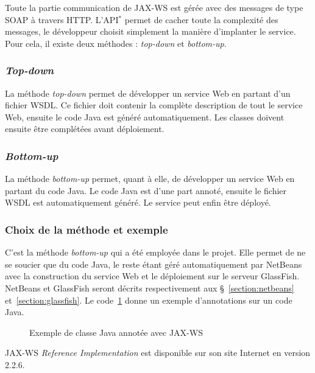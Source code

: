 Toute la partie communication de JAX-WS est g\'er\'ee avec des messages de type SOAP \`a travers HTTP.
L'API$^*$ permet de cacher toute la complexit\'e des messages, le d\'eveloppeur choisit simplement la mani\`ere d'implanter le service. 
Pour cela, il existe deux m\'ethodes : \textit{top-down} et \textit{bottom-up}.

\subsubsection{\textit{Top-down}}

La m\'ethode \textit{top-down} permet de d\'evelopper un service Web en partant d'un fichier WSDL.
Ce fichier doit contenir la compl\`ete description de tout le service Web, ensuite le code Java est g\'en\'er\'e automatiquement.
Les classes doivent ensuite \^etre compl\'et\'ees avant d\'eploiement.

\subsubsection{\textit{Bottom-up}}

La m\'ethode \textit{bottom-up} permet, quant \`a elle, de d\'evelopper un service Web en partant du code Java.
Le code Java est d'une part annot\'e, ensuite le fichier WSDL est automatiquement g\'en\'er\'e.
Le service peut enfin \^etre d\'eploy\'e.

\subsubsection{Choix de la m\'ethode et exemple}

C'est la m\'ethode \textit{bottom-up} qui a \'et\'e employ\'ee dans le projet.
Elle permet de ne se soucier que du code Java, le reste \'etant g\'er\'e automatiquement par NetBeans avec la construction du service Web et le d\'eploiement sur le serveur GlassFish.
NetBeans et GlassFish seront d\'ecrits respectivement aux \S~\ref{section:netbeans} et~\ref{section:glassfish}.
Le code~\ref{code:exempleJAXWS} donne un exemple d'annotations sur un code Java.

\clearpage

\begin{figure}[!ht]
	
	\caption{Exemple de classe Java annot\'ee avec JAX-WS}
	\label{code:exempleJAXWS}

\end{figure}

JAX-WS \textit{Reference Implementation} est disponible sur son site Internet\cite{biblio:siteJAXWS} en version 2.2.6.

\clearpage
